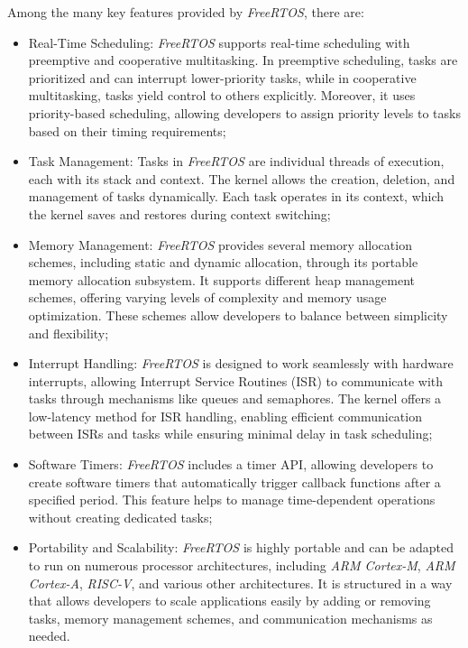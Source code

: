 Among the many key features provided by \textit{FreeRTOS}, there are:
\begin{itemize}
  \item Real-Time Scheduling: \textit{FreeRTOS} supports real-time scheduling with
    preemptive and cooperative multitasking. In preemptive scheduling, tasks are
    prioritized and can interrupt lower-priority tasks, while in cooperative
    multitasking, tasks yield control to others explicitly. Moreover, it uses priority-based
    scheduling, allowing developers to assign priority levels to tasks based on
    their timing requirements;

  \item Task Management: Tasks in \textit{FreeRTOS} are individual threads of execution,
    each with its stack and context. The kernel allows the creation, deletion, and
    management of tasks dynamically. Each task operates in its context, which the
    kernel saves and restores during context switching;

  \item Memory Management: \textit{FreeRTOS} provides several memory allocation schemes,
    including static and dynamic allocation, through its portable memory allocation
    subsystem. It supports different heap management schemes, offering varying levels
    of complexity and memory usage optimization. These schemes allow developers
    to balance between simplicity and flexibility;

  \item Interrupt Handling: \textit{FreeRTOS} is designed to work seamlessly with
    hardware interrupts, allowing Interrupt Service Routines (ISR) to
    communicate with tasks through mechanisms like queues and semaphores. The kernel
    offers a low-latency method for ISR handling, enabling efficient
    communication between ISRs and tasks while ensuring minimal delay in task
    scheduling;

  \item Software Timers: \textit{FreeRTOS} includes a timer API, allowing
    developers to create software timers that automatically trigger callback
    functions after a specified period. This feature helps to manage time-dependent
    operations without creating dedicated tasks;

  \item Portability and Scalability: \textit{FreeRTOS} is highly portable and can
    be adapted to run on numerous processor architectures, including \textit{ARM
    Cortex-M}, \textit{ARM Cortex-A}, \textit{RISC-V}, and various other
    architectures. It is structured in a way that allows developers to scale applications
    easily by adding or removing tasks, memory management schemes, and communication
    mechanisms as needed.
\end{itemize}

